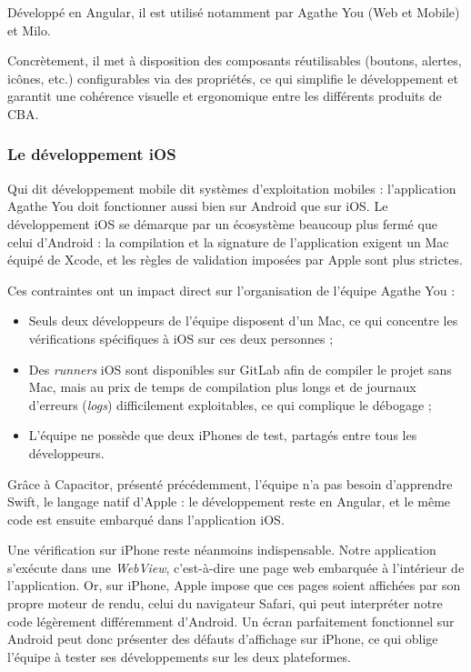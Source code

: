 \documentclass{article}
\begin{document}
Développé en Angular, il est utilisé notamment par Agathe You (Web et Mobile) et Milo.

Concrètement, il met à disposition des composants réutilisables (boutons, alertes, icônes, etc.) configurables via des propriétés, ce qui simplifie le développement et garantit une cohérence visuelle et ergonomique entre les différents produits de CBA.

\subsubsection{Le développement iOS}
\label{subsec:ios}

Qui dit développement mobile dit systèmes d'exploitation mobiles : l'application Agathe You doit fonctionner aussi bien sur Android que sur iOS. Le développement iOS se démarque par un écosystème beaucoup plus fermé que celui d'Android : la compilation et la signature de l'application exigent un Mac équipé de Xcode, et les règles de validation imposées par Apple sont plus strictes.

Ces contraintes ont un impact direct sur l'organisation de l'équipe Agathe You :

\begin{itemize}
    \item Seuls deux développeurs de l'équipe disposent d'un Mac, ce qui concentre les vérifications spécifiques à iOS sur ces deux personnes ;
    \item Des \textit{runners} iOS sont disponibles sur GitLab afin de compiler le projet sans Mac, mais au prix de temps de compilation plus longs et de journaux d'erreurs (\textit{logs}) difficilement exploitables, ce qui complique le débogage ;
    \item L'équipe ne possède que deux iPhones de test, partagés entre tous les développeurs.
\end{itemize}

Grâce à Capacitor, présenté précédemment, l'équipe n'a pas besoin d'apprendre Swift, le langage natif d'Apple : le développement reste en Angular, et le même code est ensuite embarqué dans l'application iOS.

Une vérification sur iPhone reste néanmoins indispensable. Notre application s'exécute dans une \textit{WebView}, c'est-à-dire une page web embarquée à l'intérieur de l'application. Or, sur iPhone, Apple impose que ces pages soient affichées par son propre moteur de rendu, celui du navigateur Safari, qui peut interpréter notre code légèrement différemment d'Android. Un écran parfaitement fonctionnel sur Android peut donc présenter des défauts d'affichage sur iPhone, ce qui oblige l'équipe à tester ses développements sur les deux plateformes.
\end{document}
